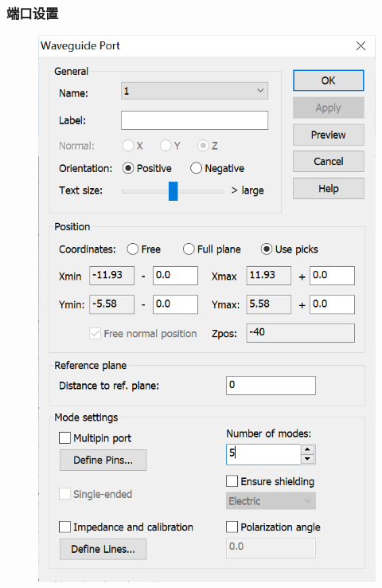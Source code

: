 \documentclass{../source/zjureport}
\begin{document}
            \subsubsection{端口设置}
            \begin{figure}[thp]
                \centering
                \includegraphics[]{figure/设置端口.png}
            \end{figure}
            \newpage
\end{document}
